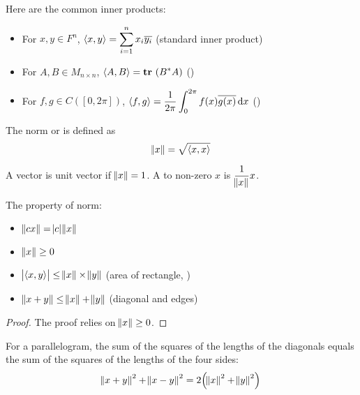 \begin{example}
    Here are the common inner products:
\begin{itemize}
    \item For $x,y \in F^n$, $\displaystyle \innerproduct{x}{y} = \sum_{i=1}^n x_i \conjugate{y_i}$ (standard inner product)
    \item For $A,B \in M_{n \times n}$, $\innerproduct{A}{B} = \trace{B^* A}$ ()
    \item For $f,g \in C([0,2 \pi])$, $\displaystyle \innerproduct{f}{g} = \frac{1}{2 \pi} \int_{0}^{2\pi} f(x) \conjugate{g(x)} \dif x$ ()\label{inner_product_space_h}
\end{itemize}
\end{example}


\begin{definition}
    The norm or  is defined as
    \begin{equation}
        \norm{x} = \sqrt{\innerproduct{x}{x}}
    \end{equation}
\end{definition}


\begin{definition}
	A vector is unit vector if $\norm{x} = 1$. A  to non-zero $x$ is $\dfrac{1}{\norm{x}} x$.
\end{definition}


\begin{theorem}
    The property of norm:
    \begin{itemize}
    \item $\norm{cx} = \abs{c} \norm{x}$
    \item $\norm{x} \geq 0$
    \item $\absolutevalue{\innerproduct{x}{y}} \leq \norm{x} \times \norm{y}$ (area of rectangle, )
    \item $\norm{x+y} \leq \norm{x} + \norm{y}$ (diagonal and edges)
    \end{itemize}
\end{theorem}

\begin{proof}
    The proof relies on $\norm{x} \geq 0$.
\end{proof}




\begin{theorem}
    For a parallelogram, the sum of the squares of the lengths of the diagonals equals the sum of the squares of the lengths of the four sides:
    \begin{equation}
        \norm{x + y}^2 + \norm{x-y}^2 = 2 \mleft(\norm{x}^2 + \norm{y}^2\mright)
    \end{equation}    
\end{theorem}


